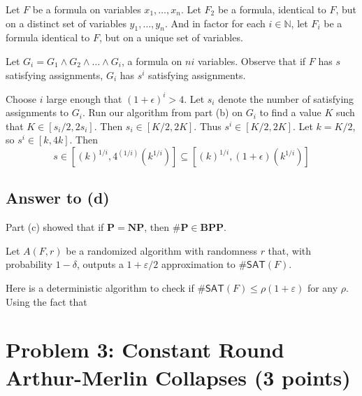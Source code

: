 \documentclass{article}
\renewcommand{\P}{\mathbf{P}}
\newcommand{\NP}{\mathbf{NP}}
\newcommand{\BPP}{\mathbf{BPP}}
\def \eps {{\varepsilon}}
\begin{document}
Let $F$ be a formula on variables $x_1, \dots, x_n$.
Let $F_2$ be a formula, identical to $F$, but on a distinct set of variables $y_1, \dots, y_n$.
And in factor for each $i \in \mathbb{N}$, let $F_i$ be a formula identical to $F$, but on a unique set of variables.

Let $G_i = G_1 \wedge G_2 \wedge \dots \wedge G_i$, a formula on $ni$ variables.
Observe that if $F$ has $s$ satisfying assignments, $G_i$ has $s^i$ satisfying assignments.

Choose $i$ large enough that $(1 + \epsilon)^i > 4$.
Let $s_i$ denote the number of satisfying assignments to $G_i$.
Run our algorithm from part (b) on $G_i$ to find a value $K$ such that
$K \in [s_i/2, 2s_i]$.
Then $s_i \in [K/2, 2K]$.
Thus $s^i \in [K/2, 2K]$.
Let $k = K/2$, so $s^i \in [k, 4k]$.
Then $$s \in [(k)^{1/i}, 4^{(1/i)}(k^{1/i})] \subseteq [(k)^{1/i}, (1 + \epsilon)(k^{1/i})]$$




\newpage
\subsection*{Answer to (d)}
Part (c) showed that if $\P = \NP$, then
$\#\P \in \BPP$.

Let $A(F, r)$ be a randomized algorithm with randomness $r$ that, with probability $1 - \delta$, outputs a $1 + \eps/2$ approximation to $\#\textsf{SAT}(F)$.

Here is a deterministic algorithm to check if $\#\textsf{SAT}(F) \leq \rho(1 + \eps)$ for any $\rho$.
Using the fact that 

\newpage
\section*{Problem 3: Constant Round Arthur-Merlin Collapses (3 points)}
\end{document}
